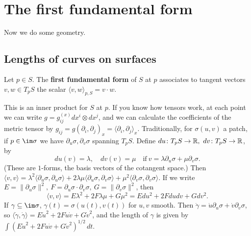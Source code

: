 \section{The first fundamental form}
Now we do some geometry. 
\subsection{Lengths of curves on surfaces}
\begin{definition}[]
    Let $p \in S$. The \textbf{first fundamental form} of $S$ at $p$ associates to tangent vectors $v,w \in T_pS$ the scalar $\langle v,w \rangle _{p,S}=v\cdot w.$
\end{definition}
This is an inner product for $S$ at $p$. If you know how tensors work, at each point we can write $g=g^{(x)}_{ij}dx^i \otimes dx^j $, and we can calculate the coefficients of the metric tensor by $g_{ij}=g(\partial _i ,\partial _j )_x=\langle \partial _i ,\partial _j  \rangle _x$. Traditionally, for $\sigma(u,v)$ a patch, if $p \in \im \sigma$ we have $\partial _u\sigma,\partial _v\sigma$ spanning $T_pS$. Define $du \colon T_pS \to \mathbb{R},\ dv \colon T_p S \to \mathbb{R}$, by \[
    du(v)=\lambda,\quad dv(v)=\mu \quad \text{if} \ v=\lambda \partial _u\sigma +\mu \partial _v\sigma.
\] (These are $1$-forms, the basis vectors of the cotangent space.) Then $\langle v,v \rangle =\lambda ^2\langle \partial _u\sigma,\partial _u\sigma \rangle +2\lambda \mu \langle \partial _u\sigma,\partial _v\sigma \rangle +\mu^2\langle \partial _v\sigma,\partial _v\sigma \rangle $. If we write $E=\|\partial _u\sigma\|^2,\ F=\partial _u\sigma \cdot \partial _v\sigma,\ G=\|\partial _v\sigma\|^2$, then \[
\langle v,v \rangle =E\lambda^2+2F\lambda \mu+G\mu^2=Edu^2+2Fdudv+Gdv^2.
\] If $\gamma \subseteq \im \sigma$, $\gamma (t)=\sigma(u(t),v(t))$ for $u,v$ smooth. Then $\dot \gamma =\dot u\partial _u\sigma+\dot v\partial _v\sigma$, so $\langle \dot \gamma ,\dot \gamma  \rangle =E\dot u^2+2F\dot u\dot v+G\dot v^2$, and the length of $\gamma $ is given by $\int (E\dot u^2+2F\dot u\dot v+G\dot v^2)^{1 /2} \, dt$.

